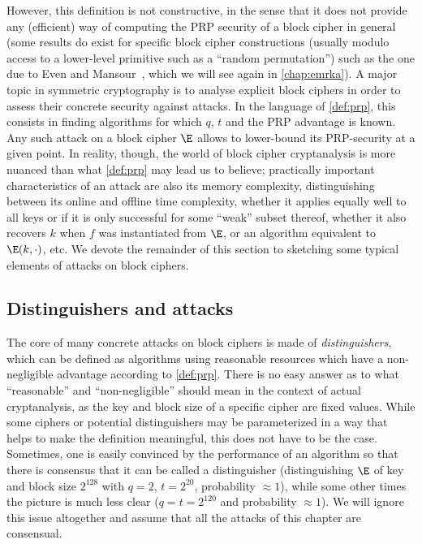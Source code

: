 However, this definition is not constructive, in the sense that it does not provide any (efficient)
way of computing the PRP security of a block cipher in general (some results do exist for specific block cipher constructions (usually modulo access to a lower-level primitive such as a
``random permutation'') such as the one due to Even and Mansour~\cite{evenmansour}, which we will see again in \autoref{chap:emrka}). 
A major topic in symmetric cryptography is to analyse explicit block ciphers in order to assess their concrete security against attacks. In the language of \autoref{def:prp}, this
consists in finding algorithms for which $q$, $t$ and the PRP advantage is known. Any such attack on a block cipher $\E$ allows to lower-bound its PRP-security at a given point.
In reality, though, the world of block cipher cryptanalysis is more nuanced than what \autoref{def:prp} may lead us to believe; practically important characteristics of an attack
are also its memory complexity, distinguishing between its online and offline time complexity, whether it applies equally well to all keys or if it is only successful
for some ``weak'' subset thereof, whether it also recovers $k$ when $f$ was instantiated from $\E$, or an algorithm equivalent to $\E(k,\cdot)$, etc. We devote the remainder of this
section to sketching some typical elements of attacks on block ciphers.

\subsection{Distinguishers and attacks}
The core of many concrete attacks on block ciphers is made of \emph{distinguishers}, which can be defined as algorithms using reasonable resources which have a non-negligible advantage according to \autoref{def:prp}.
There is no easy answer as to what ``reasonable'' and ``non-negligible'' should mean in the context of actual cryptanalysis, as the key and block size of a specific cipher are fixed values. While some ciphers or potential distinguishers
may be parameterized in a way that helps to make the definition meaningful, this does not have to be the case. Sometimes, one is easily convinced by the performance of an algorithm so that there is
consensus that it can be called a distinguisher (\eg distinguishing $\E$ of key and block size $2^{128}$ with $q = 2$, $t = 2^{20}$, probability $\approx 1$), while some other times the picture is much less clear
(\eg $q = t =  2^{120}$ and probability $\approx 1$). We will ignore this issue altogether and assume that all the attacks of this chapter are consensual.

